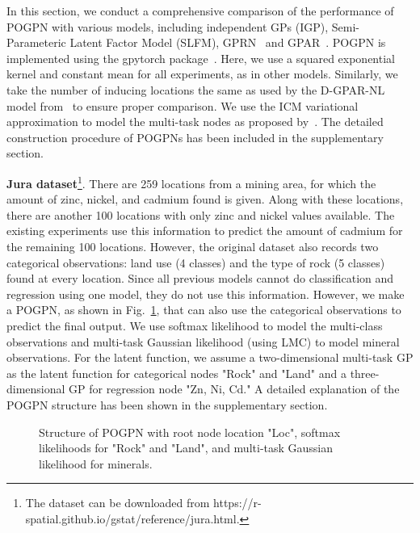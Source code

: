 In this section, we conduct a comprehensive comparison of the performance of POGPN with various models, including independent GPs (IGP), Semi-Parameteric Latent Factor Model (SLFM), GPRN~\cite{wilson2011gaussian} and GPAR~\cite{requeima2019gaussian}.
POGPN is implemented using the gpytorch package~\cite{gardner2018gpytorch}. Here, we use a squared exponential kernel and constant mean for all experiments, as in other models. Similarly, we take the number of inducing locations the same as used by the D-GPAR-NL model from~\cite{requeima2019gaussian} to ensure proper comparison. We use the ICM variational approximation to model the multi-task nodes as proposed by~\cite{van2020framework}. The detailed construction procedure of POGPNs has been included in the supplementary section.

\textbf{Jura dataset}\footnote{The dataset can be downloaded from https://r-spatial.github.io/gstat/reference/jura.html.}. There are 259 locations from a mining area, for which the amount of zinc, nickel, and cadmium found is given. Along with these locations, there are another 100 locations with only zinc and nickel values available. The existing experiments use this information to predict the amount of cadmium for the remaining 100 locations. However, the original dataset also records two categorical observations: land use (4 classes) and the type of rock (5 classes) found at every location. Since all previous models cannot do classification and regression using one model, they do not use this information. However, we make a POGPN, as shown in Fig.~\ref{fig:jura_dag}, that can also use the categorical observations to predict the final output. We use softmax likelihood to model the multi-class observations and multi-task Gaussian likelihood (using LMC) to model mineral observations. For the latent function, we assume a two-dimensional multi-task GP as the latent function for categorical nodes "Rock" and "Land" and a three-dimensional GP for regression node "Zn, Ni, Cd." A detailed explanation of the POGPN structure has been shown in the supplementary section.

\begin{figure}[h]
      \centering
      
      \caption{Structure of POGPN with root node location "Loc", softmax likelihoods for "Rock" and "Land", and multi-task Gaussian likelihood for minerals.}
      \vspace{-1em}
      \label{fig:jura_dag}
\end{figure}


